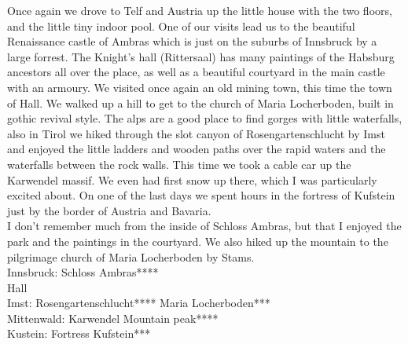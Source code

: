 Once again we drove to Telf and Austria up the little house with the two floors, and the little tiny indoor pool. One of our visits lead us to the beautiful Renaissance castle of Ambras which is just on the suburbs of Innsbruck by a large forrest. The Knight's hall (Rittersaal) has many paintings of the Habsburg ancestors all over the place, as well as a beautiful courtyard in the main castle with an armoury. We visited once again an old mining town, this time the town of Hall. We walked up a hill to get to the church of Maria Locherboden, built in gothic revival style. The alps are a good place to find gorges with little waterfalls, also in Tirol we hiked through the slot canyon of Rosengartenschlucht by Imst and enjoyed the little ladders and wooden paths over the rapid waters and the waterfalls between the rock walls. This time we took a cable car up the Karwendel massif. We even had first snow up there, which I was particularly excited about. On one of the last days we spent hours in the fortress of Kufstein just by the border of Austria and Bavaria.\\
I don't remember much from the inside of Schloss Ambras, but that I enjoyed the park and the paintings in the courtyard. We also hiked up the mountain to the pilgrimage church of Maria Locherboden by Stams.\\

Innsbruck: Schloss Ambras****\\
Hall\\
Imst: Rosengartenschlucht****
Maria Locherboden***\\
Mittenwald: Karwendel Mountain peak****\\
Kustein: Fortress Kufstein***\\

